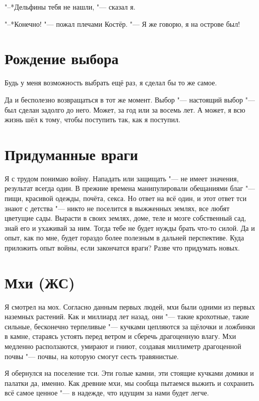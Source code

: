 \documentclass[a4paper,10pt]{book}
\newcommand{\ldotst}{\so{...}\xspace}
\begin{document}
"--*Дельфины тебя не нашли, "--- сказал я.

"--*Конечно! "--- пожал плечами Костёр. "--- Я же говорю, я на острове был!
 
 \section{Рождение выбора}

 Будь у меня возможность выбрать ещё раз, я сделал бы то же самое.

Да и бесполезно возвращаться в тот же момент. Выбор "--- настоящий выбор "--- был сделан задолго до него. Может, за год или за восемь лет. А может, я всю жизнь шёл к тому, чтобы поступить так, как я поступил.
 
 \section{Придуманные враги}

 Я с трудом понимаю войну. Нападать или защищать "--- не имеет значения, 
результат всегда один. В прежние времена манипулировали обещаниями благ "--- 
пищи, красивой одежды, почёта, секса. Но ответ на всё один, и этот ответ тси 
знают с детства "--- никто не поселится в выжженных землях, все любят цветущие 
сады. Вырасти в своих землях, доме, теле и мозге собственный сад, знай его и 
ухаживай за ним. Тогда тебе не будет нужды брать что-то силой. Да и опыт, как 
по 
мне, будет гораздо более полезным в дальней перспективе. Куда приложить опыт 
войны, если закончатся враги? Разве что придумать новых.


 
 \section{Мхи (ЖС)}

Я смотрел на мох. Согласно данным первых людей, мхи были одними из первых 
наземных растений. Как и миллиард лет назад, они "--- такие крохотные, такие 
сильные, бесконечно терпеливые "--- кучками цепляются за щёлочки и ложбинки в 
камне, стараясь устоять перед ветром и сберечь драгоценную влагу. Мхи медленно 
расползаются, умирают и гниют, создавая миллиметр драгоценной почвы "--- почвы, 
на которую смогут сесть травянистые.

Я обернулся на поселение тси. Эти голые камни, эти стоящие кучками домики и 
палатки\ldotst да, именно. Как древние мхи, мы сообща пытаемся выжить и 
сохранить всё самое ценное "--- в надежде, что идущим за нами будет легче.
 
\end{document}
